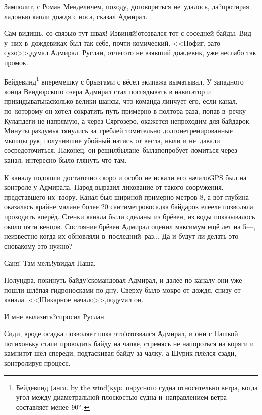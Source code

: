 \diagdash Замполит, с Роман Менделичем, походу, договориться не~удалось, да?\mdash протирая ладонью капли дождя с носа, сказал Адмирал.

\diagdash Сам видишь, со связью тут швах! Извиняй!\mdash отозвался тот с соседней байды. Вид у~них в~дождевиках был так себе, почти комический. <<Пофиг, зато сухо>>,\mdash думал Адмирал. Руслан, отчего\sdash то не взявший дождевик, уже неслабо так промок.

\renewcommand*{\thefootnote}{\fnsymbol{footnote}}
\setcounter{footnote}{0}
Бейдевинд\footnote{Бейдевинд (англ. by the wind)\mdash курс парусного судна относительно ветра, когда угол между диаметральной плоскостью судна и~направлением ветра составляет менее $90\degree$\cite{МорскойСправочник}.} вперемешку с брызгами с вёсел экипажа выматывал. У западного конца Вендюрского озера Адмирал стал поглядывать в навигатор и прикидывать\mdash насколько велики шансы, что команда линчует его, если канал, по~которому он хотел сократить путь примерно в полтора раза, попав в~речку Кулапдеги не напрямую, а через Сяргозеро, окажется непроходим для байдарок. Минуты раздумья тянулись за~греблей томительно долго\mdash нетренированные мышцы рук, получившие убойный натиск от весла, ныли и не~давали сосредоточиться. Наконец, он решил\mdash была\sdash не~была\mdash попробует ломиться через канал, интересно было глянуть что там.

К каналу подошли достаточно скоро и особо не искали его начало\mdash GPS был на контроле у Адмирала. Народ выразил ликование от такого сооружения, представшего их~взору. Канал был шириной примерно метров 8, а вот глубина оказалась крайне мала\mdash не более 20 сантиметров\mdash осадка байдарок еле\sdash еле позволяла проходить вперёд. Стенки канала были сделаны из брёвен, из воды показывалось около пяти венцов. Состояние брёвен Адмирал оценил максимум ещё лет на 5\thinspace\nobreakdash---, неизвестно когда их обновляли в~последний~раз$\ldots$ Да и будут ли делать это снова\mdash кому это нужно?

\diagdash Саня! Там мель!\mdash увидал Паша. 

\diagdash Полундра, покинуть байду!\mdash скомандовал Адмирал, и далее по каналу они уже пошли шлёпая гидроносками по дну. Сверху было мокро от дождя, снизу от канала. <<Шикарное начало>>,\mdash подумал он.

\diagdash И мне вылазить?\mdash спросил Руслан. 

\diagdash Сиди, вроде осадка позволяет пока что!\mdash отозвался Адмирал, и они с Пашкой потихоньку стали проводить байду на чалке, стремясь не напороться на коряги и камни\mdash тот шёл спереди, подтаскивая байду за чалку, а Шурик плёлся сзади, контролируя процесс.

